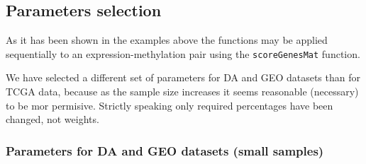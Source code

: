 \documentclass[a4paper,10pt]{article}\usepackage[]{graphicx}\usepackage[]{xcolor}
\begin{document}
\subsection{Parameters selection}

As it has been shown in the examples above the functions 
may be applied sequentially to an expression-methylation pair using the 
\texttt{scoreGenesMat} function.

We have selected a different set of parameters for DA and GEO datasets than for TCGA data, because as the sample size increases it seems reasonable (necessary) to be mor permisive. Strictly speaking only required percentages have been changed, not weights.

\subsubsection{Parameters for DA and GEO datasets (small samples)}
\end{document}
